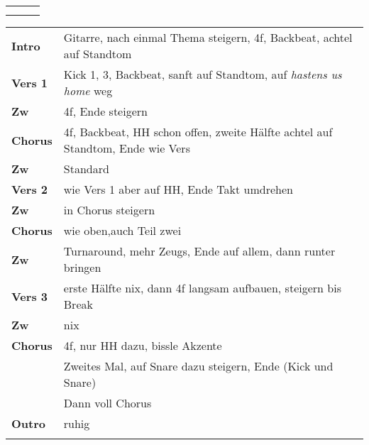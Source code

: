 

\begin{tabular}{p{0.6cm}p{12cm}p{1.4cm}}
	\rowcolor{cyan} \myRow{\thesongnumber} & \myRow{Christ Our Glory} & \myRow{152} \\
	                                       &                          &             \\
\end{tabular}

\begin{tabular}{p{1.6cm}l}
	\textbf{Intro}  & Gitarre, nach einmal Thema \viertel steigern, 4f, Backbeat, achtel auf Standtom   \\
	\textbf{Vers 1} & Kick 1, 3, Backbeat, sanft \achtel auf Standtom, auf \textit{hastens us home} weg \\
	\textbf{Zw}     & 4f, Ende steigern                                                                 \\
	\textbf{Chorus} & 4f, Backbeat, HH schon offen, zweite Hälfte achtel auf Standtom, Ende wie Vers    \\
	\textbf{Zw}     & Standard                                                                          \\
	\textbf{Vers 2} & wie Vers 1 aber auf HH, Ende Takt umdrehen                                        \\
	\textbf{Zw}     & in Chorus steigern                                                                \\
	\textbf{Chorus} & wie oben,auch Teil zwei                                                           \\
	\textbf{Zw}     & Turnaround, mehr Zeugs, Ende \viertel auf allem, dann runter bringen              \\
	\textbf{Vers 3} & erste Hälfte nix, dann 4f langsam aufbauen, steigern bis Break                    \\
	\textbf{Zw}     & nix                                                                               \\
	\textbf{Chorus} & 4f, nur HH dazu, bissle Akzente                                                   \\
	                & Zweites Mal, \viertel auf Snare dazu steigern, Ende \achtel (Kick und Snare)      \\
	                & Dann voll Chorus                                                                  \\
	\textbf{Outro}  & ruhig                                                                             \\
	                &                                                                                   \\
\end{tabular}
